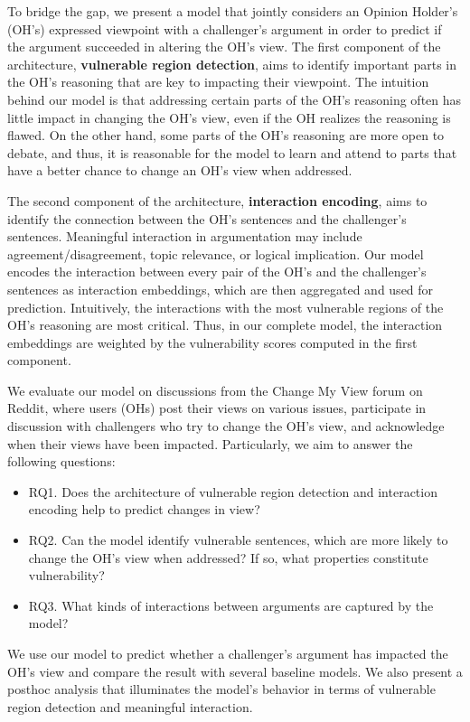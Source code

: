 \documentclass[11pt,a4paper]{article}
\begin{document}
To bridge the gap, we present a model that jointly considers an Opinion Holder's (OH's) expressed viewpoint with a challenger's argument in order to predict if the argument succeeded in altering the OH's view.
The first component of the architecture, \textbf{vulnerable region detection}, aims to identify important parts in the OH's reasoning that are key to impacting their viewpoint. The intuition behind our model is that addressing certain parts of the OH's reasoning often has little impact in changing the OH's view, even if the OH realizes the reasoning is flawed. On the other hand, some parts of the OH's reasoning are more open to debate, and thus, it is reasonable for the model to learn and attend to parts that have a better chance to change an OH's view when addressed.  

The second component of the architecture, \textbf{interaction encoding}, aims to identify the connection between the OH's sentences and the challenger's sentences. Meaningful interaction in argumentation may include agreement/disagreement, topic relevance, or logical implication. Our model encodes the interaction between every pair of the OH's and the challenger's sentences as interaction embeddings, which are then aggregated and used for prediction. Intuitively, the interactions with the most vulnerable regions of the OH's reasoning are most critical.  Thus, in our complete model, the interaction embeddings are weighted by the vulnerability scores computed in the first component.


We evaluate our model on discussions from the Change My View forum on Reddit, where users (OHs) post their views on various issues, participate in discussion with challengers who try to change the OH's view, and acknowledge when their views have been impacted. 
Particularly, we aim to answer the following questions:
\begin{itemize}
\setlength\itemsep{0em}
    \item RQ1. Does the architecture of vulnerable region detection and interaction encoding help to predict changes in view?
    \item RQ2. Can the model identify vulnerable sentences, which are more likely to change the OH's view when addressed? If so, what properties constitute vulnerability?
    \item RQ3. What kinds of interactions between arguments are captured by the model?
\end{itemize}
We use our model to predict whether a challenger's argument has impacted the OH's view and compare the result with several baseline models.  We also present a posthoc analysis that illuminates the model's behavior in terms of vulnerable region detection and meaningful interaction.
\end{document}
